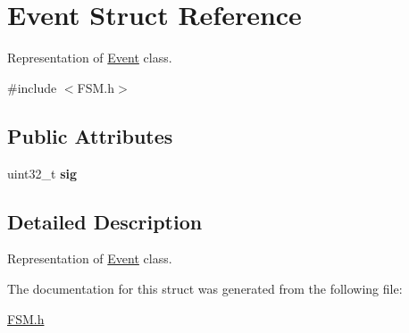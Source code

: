 \section{Event Struct Reference}
\label{struct_event}


Representation of \hyperlink{struct_event}{Event} class.  




{\ttfamily \#include $<$FSM.h$>$}

\subsection*{Public Attributes}
\begin{DoxyCompactItemize}
\item 
uint32\_\-t {\bfseries sig}\label{struct_event_aca4f9426de30af84cb61e6f084dea6d2}

\end{DoxyCompactItemize}


\subsection{Detailed Description}
Representation of \hyperlink{struct_event}{Event} class. 

The documentation for this struct was generated from the following file:\begin{DoxyCompactItemize}
\item 
\hyperlink{_f_s_m_8h}{FSM.h}\end{DoxyCompactItemize}
